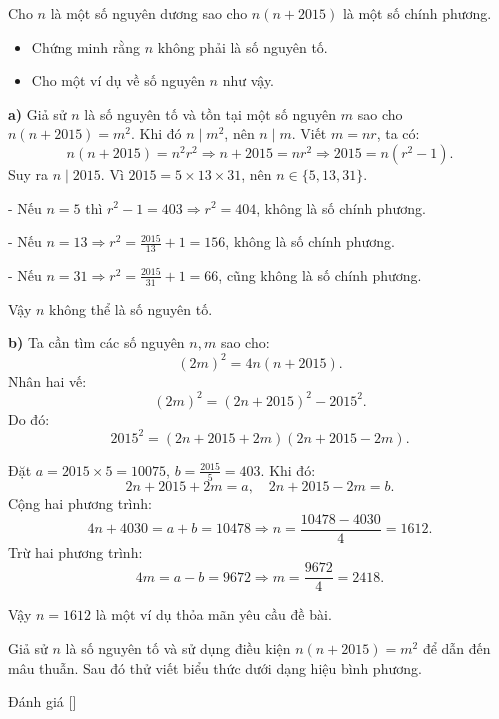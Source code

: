 \ifshowproblem
\begin{problem}\label{problem:FRA-2015-TST1-P3}
	Cho \( n \) là một số nguyên dương sao cho \( n(n + 2015) \) là một số chính phương.
    \begin{itemize}[topsep=0pt, partopsep=0pt, itemsep=0pt]
        \item Chứng minh rằng \( n \) không phải là số nguyên tố.
        \item Cho một ví dụ về số nguyên \( n \) như vậy.
    \end{itemize}
\end{problem}
\fi

\ifshowsoln
\begin{soln}\footnotemark
    \textbf{a)} Giả sử \( n \) là số nguyên tố và tồn tại một số nguyên \( m \) sao cho \( n(n + 2015) = m^2 \). Khi đó \( n \mid m^2 \), nên \( n \mid m \). Viết \( m = nr \), ta có:
    \[
        n(n + 2015) = n^2 r^2 \Rightarrow n + 2015 = nr^2 \Rightarrow 2015 = n(r^2 - 1).
    \]
    Suy ra \( n \mid 2015 \). Vì \( 2015 = 5 \times 13 \times 31 \), nên \( n \in \{5, 13, 31\} \).

    - Nếu \( n = 5 \) thì \( r^2 - 1 = 403 \Rightarrow r^2 = 404 \), không là số chính phương.

    - Nếu \( n = 13 \Rightarrow r^2 = \frac{2015}{13} + 1 = 156 \), không là số chính phương.

    - Nếu \( n = 31 \Rightarrow r^2 = \frac{2015}{31} + 1 = 66 \), cũng không là số chính phương.

    Vậy \( n \) không thể là số nguyên tố.

    \textbf{b)} Ta cần tìm các số nguyên \( n, m \) sao cho:
    \[
        (2m)^2 = 4n(n + 2015).
    \]
    Nhân hai vế:
    \[
        (2m)^2 = (2n + 2015)^2 - 2015^2.
    \]
    Do đó:
    \[
        2015^2 = (2n + 2015 + 2m)(2n + 2015 - 2m).
    \]

    Đặt \( a = 2015 \times 5 = 10075 \), \( b = \frac{2015}{5} = 403 \). Khi đó:
    \[
        2n + 2015 + 2m = a, \quad 2n + 2015 - 2m = b.
    \]
    Cộng hai phương trình:
    \[
        4n + 4030 = a + b = 10478 \Rightarrow n = \frac{10478 - 4030}{4} = 1612.
    \]
    Trừ hai phương trình:
    \[
        4m = a - b = 9672 \Rightarrow m = \frac{9672}{4} = 2418.
    \]

    Vậy \( n = 1612 \) là một ví dụ thỏa mãn yêu cầu đề bài.
\end{soln}
\fi

\ifshowhint
\begin{hint*}
    Giả sử \( n \) là số nguyên tố và sử dụng điều kiện \( n(n + 2015) = m^2 \) để dẫn đến mâu thuẫn. Sau đó thử viết biểu thức dưới dạng hiệu bình phương.
\end{hint*}
\fi

\ifshowinfo
\begin{remark*}
    Đánh giá [\textbf{}]
\end{remark*}
\newpage
\fi